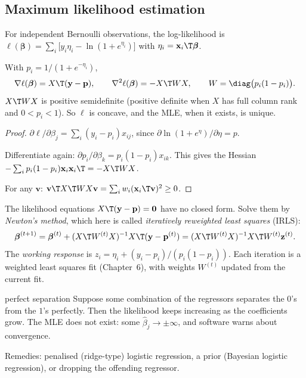 \subsection{Maximum likelihood estimation}

For independent Bernoulli observations, the log-likelihood is $\ell(\boldsymbol\beta)=\sum_i\big[y_i\eta_i-\ln(1+e^{\eta_i})\big]$ with $\eta_i=\mathbf{x}_i\T\boldsymbol\beta$.

\begin{theorem}\label{thm:logit-score}
With $p_i=1/(1+e^{-\eta_i})$,
\[ \nabla\ell(\boldsymbol\beta)=X\T(\mathbf{y}-\mathbf{p}),\qquad\nabla^2\ell(\boldsymbol\beta)=-X\T WX,\qquad W=\diag\big(p_i(1-p_i)\big). \]
$X\T WX$ is positive semidefinite (positive definite when $X$ has full column rank and $0<p_i<1$). So $\ell$ is concave, and the MLE, when it exists, is unique.
\end{theorem}

\begin{proof}
$\partial\ell/\partial\beta_j=\sum_i(y_i-p_i)x_{ij}$, since $\partial\ln(1+e^{\eta})/\partial\eta=p$.

Differentiate again: $\partial p_i/\partial\beta_k=p_i(1-p_i)x_{ik}$. This gives the Hessian $-\sum_ip_i(1-p_i)\mathbf{x}_i\mathbf{x}_i\T=-X\T WX$.

For any $\mathbf{v}$: $\mathbf{v}\T X\T WX\mathbf{v}=\sum_iw_i(\mathbf{x}_i\T\mathbf{v})^2\ge0$.
\end{proof}

The likelihood equations $X\T(\mathbf{y}-\mathbf{p})=\mathbf{0}$ have no closed form. Solve them by \emph{Newton's method}, which here is called \emph{iteratively reweighted least squares} (IRLS):
\[ \boldsymbol\beta^{(t+1)}=\boldsymbol\beta^{(t)}+(X\T W^{(t)}X)^{-1}X\T(\mathbf{y}-\mathbf{p}^{(t)})=(X\T W^{(t)}X)^{-1}X\T W^{(t)}\mathbf{z}^{(t)}. \]
The \emph{working response} is $z_i=\eta_i+(y_i-p_i)/(p_i(1-p_i))$. Each iteration is a weighted least squares fit (Chapter~6), with weights $W^{(t)}$ updated from the current fit.

\begin{pitfall}{perfect separation}
Suppose some combination of the regressors separates the $0$'s from the $1$'s perfectly. Then the likelihood keeps increasing as the coefficients grow. The MLE does not exist: some $\hat\beta_j\to\pm\infty$, and software warns about convergence.

Remedies: penalised (ridge-type) logistic regression, a prior (Bayesian logistic regression), or dropping the offending regressor.
\end{pitfall}

